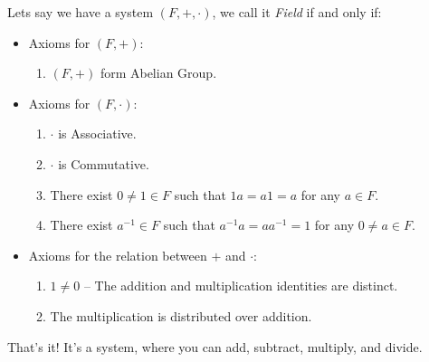 Lets say we have a system $(F,+,\cdot)$, we call it {\it Field} if and only if:
\begin{itemize}
    \item Axioms for $(F,+)$:
    \begin{enumerate}
        \item $(F,+)$ form Abelian Group.
    \end{enumerate}
    \item Axioms for $(F,\cdot)$:
    \begin{enumerate}
        \item $\cdot$ is Associative.
        \item $\cdot$ is Commutative.
        \item There exist $0 \neq 1 \in F$ such that $1a = a1 = a$ for any $a \in F$.
        \item There exist $a^{-1} \in F$ such that $a^{-1}a = aa^{-1} = 1$ for any $0 \neq a \in F$.
    \end{enumerate}
    \item Axioms for the relation between $+$ and $\cdot$:
    \begin{enumerate}
        \item $1 \neq 0$ -- The addition and multiplication identities are distinct.
        \item The multiplication is distributed over addition.
    \end{enumerate}
\end{itemize}
That's it! It's a system, where you can add, subtract, multiply, and divide.